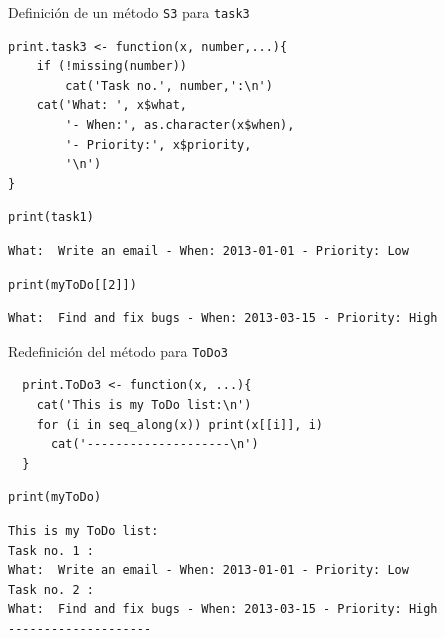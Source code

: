 \documentclass[xcolor={usenames,svgnames,dvipsnames}]{beamer}
\begin{document}
\begin{frame}[fragile,label={sec:orgheadline13}]{Definición de un método \texttt{S3} para \texttt{task3}}
 \lstset{language=R,label= ,caption= ,captionpos=b,numbers=none}
\begin{lstlisting}
print.task3 <- function(x, number,...){
    if (!missing(number))
        cat('Task no.', number,':\n')
    cat('What: ', x$what,
        '- When:', as.character(x$when),
        '- Priority:', x$priority,
        '\n')
}
\end{lstlisting}

\lstset{language=R,label= ,caption= ,captionpos=b,numbers=none}
\begin{lstlisting}
print(task1)
\end{lstlisting}

\begin{verbatim}
What:  Write an email - When: 2013-01-01 - Priority: Low
\end{verbatim}

\lstset{language=R,label= ,caption= ,captionpos=b,numbers=none}
\begin{lstlisting}
print(myToDo[[2]])
\end{lstlisting}

\begin{verbatim}
What:  Find and fix bugs - When: 2013-03-15 - Priority: High
\end{verbatim}
\end{frame}

\begin{frame}[fragile,label={sec:orgheadline14}]{Redefinición del método para \texttt{ToDo3}}
 \lstset{language=R,label= ,caption= ,captionpos=b,numbers=none}
\begin{lstlisting}
  print.ToDo3 <- function(x, ...){
    cat('This is my ToDo list:\n')
    for (i in seq_along(x)) print(x[[i]], i)
      cat('--------------------\n')
  }
\end{lstlisting}

\lstset{language=R,label= ,caption= ,captionpos=b,numbers=none}
\begin{lstlisting}
print(myToDo)
\end{lstlisting}

\begin{verbatim}
This is my ToDo list:
Task no. 1 :
What:  Write an email - When: 2013-01-01 - Priority: Low 
Task no. 2 :
What:  Find and fix bugs - When: 2013-03-15 - Priority: High 
--------------------
\end{verbatim}
\end{frame}
\end{document}
